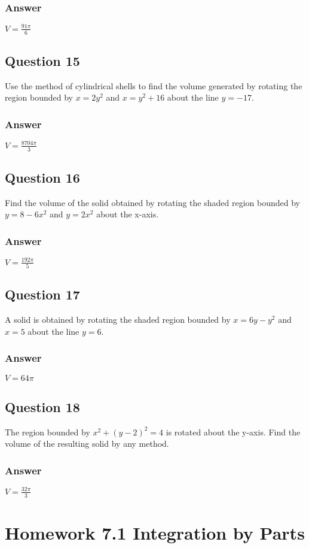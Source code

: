 \documentclass{article}
\begin{document}
\subsubsection*{Answer}
$ V = \frac{91\pi}{6} $

\subsection*{Question 15}
Use the method of cylindrical shells to find the volume generated by rotating the region bounded by $x=2y^2$ and $x=y^2+16$ about the line $y=-17$.
\subsubsection*{Answer}
$ V = \frac{8704\pi}{3} $

\subsection*{Question 16}
Find the volume of the solid obtained by rotating the shaded region bounded by $y=8-6x^2$ and $y=2x^2$ about the x-axis.
\subsubsection*{Answer}
$ V = \frac{192\pi}{5} $

\subsection*{Question 17}
A solid is obtained by rotating the shaded region bounded by $x=6y-y^2$ and $x=5$ about the line $y=6$.
\subsubsection*{Answer}
$ V = 64\pi $

\subsection*{Question 18}
The region bounded by $x^2 + (y-2)^2 = 4$ is rotated about the y-axis. Find the volume of the resulting solid by any method.
\subsubsection*{Answer}
$ V = \frac{32\pi}{3} $

\newpage
\section{Homework 7.1 Integration by Parts}
\end{document}
